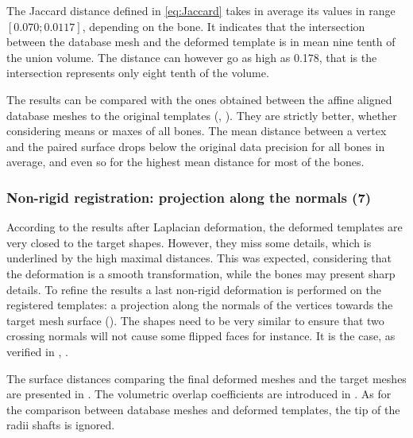 The Jaccard distance defined in \eqref{eq:Jaccard} takes in average its values in range $[0.070;0.0117]$, depending on the bone. It indicates that the intersection between the database mesh and the deformed template is in mean nine tenth of the union volume. The distance can however go as high as 0.178, that is the intersection represents only eight tenth of the volume. %


The results can be compared with the ones obtained between the affine aligned database meshes \mr* to the original templates \mt* (, ). They are strictly better, whether considering means or maxes of all bones. The mean distance between a vertex and the paired surface drops below the original data precision for all bones in average, and even so for the highest mean distance for most of the bones. 






\subsubsection{Non-rigid registration: projection along the normals (7)}
\label{ssubsec:projection_validation}

According to the results after Laplacian deformation, the deformed templates are very closed to the target shapes. However, they miss some details, which is underlined by the high maximal distances. This was expected, considering that the deformation is a smooth transformation, while the bones may present sharp details. To refine the results a last non-rigid deformation is performed on the registered templates: a projection along the normals of the vertices towards the target mesh surface (). The shapes need to be very similar to ensure that two crossing normals will not cause some flipped faces for instance. It is the case, as verified in , . 

The surface distances comparing the final deformed meshes \mw* and the target meshes \mr* are presented in . The volumetric overlap coefficients are introduced in . 
As for the comparison between database meshes and deformed templates, the tip of the radii shafts is ignored. 



